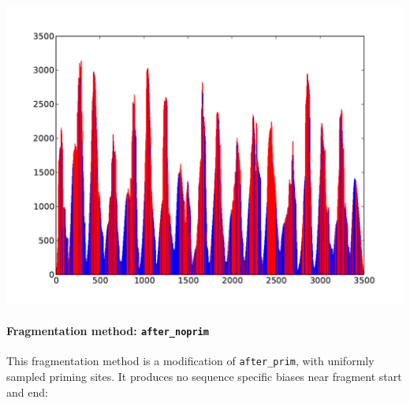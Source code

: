 \begin{center}
\includegraphics[scale=0.6,page=1]{../src/test/cov/cov_after_prim.pdf}
\end{center}


\paragraph{{Fragmentation method: }\texttt{after\_noprim}}

This fragmentation method is a modification of \texttt{after\_prim}, with uniformly sampled priming sites.
It produces no sequence specific biases near fragment start and end:


